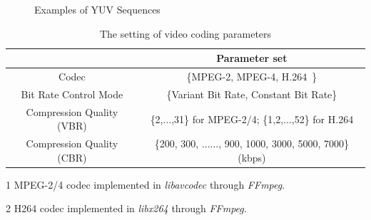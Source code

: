 \documentclass[journal,sort]{IEEEtran}
\begin{document}
\begin{figure}[h]
	\label{dataset}
	\centering
	\hspace{0.15in}
	\hspace{0.15in}
	\caption{\label{Fig.example}Examples of YUV Sequences}
	\label{Fig.lable}
\end{figure}

\begin{table}
	\centering
	\caption{\label{encode-settings}The setting of video coding parameters}
	\begin{threeparttable}
		\begin{tabular}{ c c }
			\toprule
			& Parameter set  \\\midrule
			Codec&\{MPEG-2\tnote{1}, MPEG-4\tnote{1}, H.264\tnote{2}~\}\\\midrule
			Bit Rate Control Mode&\{Variant Bit Rate, Constant Bit Rate\}\\\midrule
			Compression Quality (VBR)&\{2,...,31\} for MPEG-2/4; \{1,2,...,52\} for H.264\\\midrule
			Compression Quality (CBR)&\{200, 300, ......, 900, 1000, 3000, 5000, 7000\}(kbps)\\
			\bottomrule
		\end{tabular}
		\begin{tablenotes}
			\footnotesize
			\item[1] MPEG-2/4 codec implemented in \emph{libavcodec} through \emph{FFmpeg}.
			\item[2] H264 codec implemented in \emph{libx264} through \emph{FFmpeg}.
		\end{tablenotes}
	\end{threeparttable}
\end{table}
\end{document}
